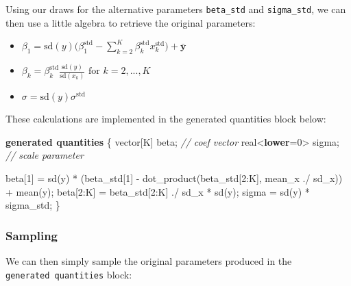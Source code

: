 \documentclass[
  11pt,
]{article}
\newenvironment{Shaded}{\begin{snugshade}}{\end{snugshade}}
\newcommand{\CommentTok}[1]{\textcolor[rgb]{0.56,0.35,0.01}{\textit{#1}}}
\newcommand{\DataTypeTok}[1]{\textcolor[rgb]{0.13,0.29,0.53}{#1}}
\newcommand{\DecValTok}[1]{\textcolor[rgb]{0.00,0.00,0.81}{#1}}
\newcommand{\KeywordTok}[1]{\textcolor[rgb]{0.13,0.29,0.53}{\textbf{#1}}}
\newcommand{\NormalTok}[1]{#1}
\providecommand{\tightlist}{%
  \setlength{\itemsep}{0pt}\setlength{\parskip}{0pt}}
\begin{document}
Using our draws for the alternative parameters \texttt{beta\_std} and \texttt{sigma\_std}, we can then use a little algebra to retrieve the original parameters:

\begin{itemize}
\tightlist
\item
  \(\beta_1 = \text{sd}(y) \Big(\beta_1^{\text{std}} - \sum_{k=2}^{K} \beta_k^{\text{std}} x_k^{\text{std}}\Big) + \bar{\mathbf{y}}\)
\item
  \(\beta_k = \beta_k^{\text{std}} \frac{\text{sd}(y)}{\text{sd}(x_k)} \text{ for } k = 2,...,K\)
\item
  \(\sigma = \text{sd}(y) \sigma^{\text{std}}\)
\end{itemize}

These calculations are implemented in the generated quantities block below:

\begin{Shaded}
\begin{Highlighting}[]
\KeywordTok{generated quantities}\NormalTok{ \{}
  \DataTypeTok{vector}\NormalTok{[K] beta;          }\CommentTok{// coef vector}
  \DataTypeTok{real}\NormalTok{\textless{}}\KeywordTok{lower}\NormalTok{=}\DecValTok{0}\NormalTok{\textgreater{} sigma;     }\CommentTok{// scale parameter}
  
\NormalTok{  beta[}\DecValTok{1}\NormalTok{] = sd(y) * (beta\_std[}\DecValTok{1}\NormalTok{] {-} }
\NormalTok{    dot\_product(beta\_std[}\DecValTok{2}\NormalTok{:K], mean\_x ./ sd\_x)) + mean(y);}
\NormalTok{  beta[}\DecValTok{2}\NormalTok{:K] = beta\_std[}\DecValTok{2}\NormalTok{:K] ./ sd\_x * sd(y);}
\NormalTok{  sigma = sd(y) * sigma\_std;}
\NormalTok{\}}
\end{Highlighting}
\end{Shaded}

\hypertarget{sampling}{%
\subsubsection{Sampling}\label{sampling}}

We can then simply sample the original parameters produced in the \texttt{generated\ quantities} block:
\end{document}
